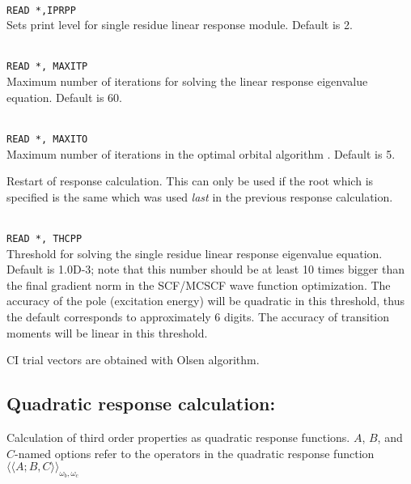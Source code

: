 \begin{description}
\item{}\\
\verb|READ *,IPRPP|\\
Sets print level for single residue linear response module. Default is 2.

\item{}\\
\verb|READ *, MAXITP|\\
Maximum number of iterations for solving the linear response eigenvalue
equation. Default is 60.

\item{}\\
\verb|READ *, MAXITO|\\
Maximum number of iterations in the optimal orbital
algorithm
\cite{tuhjahjajpjjcp84}. 
Default is 5.

\item{}
Restart of response
calculation. This can only be used if the root which is 
specified is the same which was used \textit{last} in the previous
response calculation.

\item{}\\
\verb|READ *, THCPP|\\
Threshold for solving the single residue linear response eigenvalue equation. 
Default is 1.0D-3; note that this number should be at least 10 times
bigger than the final gradient norm in the SCF/MCSCF
wave function optimization.
The accuracy of the pole (excitation energy) will be 
quadratic in this threshold, thus the default corresponds to approximately
6 digits. The accuracy of transition moments will be linear in this threshold.

\item{}
CI trial vectors are obtained with Olsen algorithm.

\end{description}

\subsection{Quadratic response calculation: }

Calculation of third order properties
 as quadratic response
functions.
$A$, $B$, and $C$-named options refer to the operators in the quadratic
response function 
$\langle\!\langle A;B,C \rangle\!\rangle_{\omega_b,\omega_c}$
\cite{ovhapjhjajthjojcp97,hhhjajpjjojcp97,haovhkpjthjcp98}

